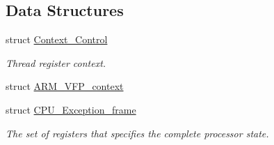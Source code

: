 \subsection*{Data Structures}
\begin{DoxyCompactItemize}
\item 
struct \mbox{\hyperlink{structContext__Control}{Context\+\_\+\+Control}}
\begin{DoxyCompactList}\small\item\em Thread register context. \end{DoxyCompactList}\item 
struct \mbox{\hyperlink{structARM__VFP__context}{A\+R\+M\+\_\+\+V\+F\+P\+\_\+context}}
\item 
struct \mbox{\hyperlink{structCPU__Exception__frame}{C\+P\+U\+\_\+\+Exception\+\_\+frame}}
\begin{DoxyCompactList}\small\item\em The set of registers that specifies the complete processor state. \end{DoxyCompactList}\end{DoxyCompactItemize}
